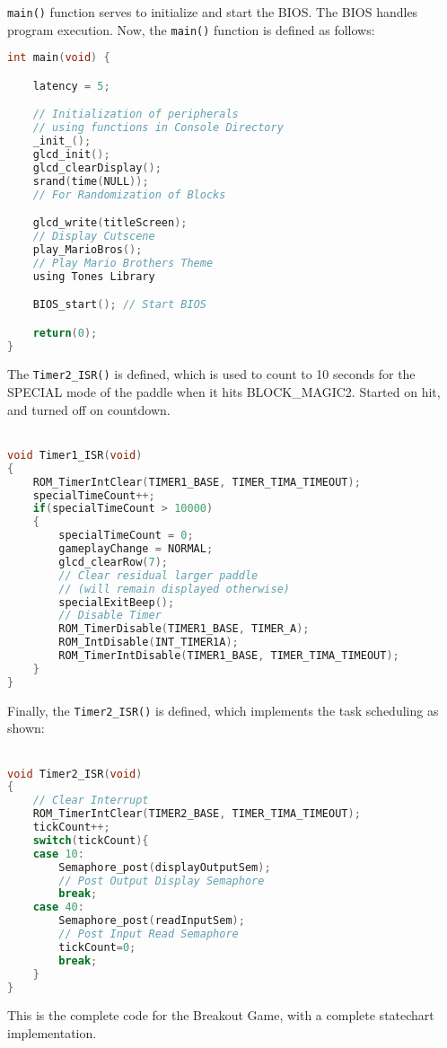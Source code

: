 \documentclass{article}
\begin{document}
\qquad \texttt{main()} function serves to initialize and start the BIOS. The BIOS handles program execution. Now, the \texttt{main()} function is defined as follows:
      \begin{lstlisting}[basicstyle = \small, language = C]
int main(void) {

    latency = 5;

    // Initialization of peripherals 
    // using functions in Console Directory
    _init_();
    glcd_init();
    glcd_clearDisplay();
    srand(time(NULL)); 
    // For Randomization of Blocks

    glcd_write(titleScreen); 
    // Display Cutscene
    play_MarioBros(); 
    // Play Mario Brothers Theme
    using Tones Library

    BIOS_start(); // Start BIOS

    return(0);
}
  \end{lstlisting}
\qquad The \texttt{Timer2\_ISR()} is defined, which is used to count to 10 seconds for the SPECIAL mode of the paddle when it hits BLOCK\_MAGIC2. Started on hit, and turned off on countdown.\\ \\
      \begin{lstlisting}[basicstyle = \small, language = C]
void Timer1_ISR(void)
{
    ROM_TimerIntClear(TIMER1_BASE, TIMER_TIMA_TIMEOUT);
    specialTimeCount++;
    if(specialTimeCount > 10000)
    {
        specialTimeCount = 0;
        gameplayChange = NORMAL;
        glcd_clearRow(7); 
        // Clear residual larger paddle 
        // (will remain displayed otherwise)
        specialExitBeep();
        // Disable Timer
        ROM_TimerDisable(TIMER1_BASE, TIMER_A);
        ROM_IntDisable(INT_TIMER1A);
        ROM_TimerIntDisable(TIMER1_BASE, TIMER_TIMA_TIMEOUT);
    }
}
  \end{lstlisting}
\qquad Finally, the \texttt{Timer2\_ISR()} is defined, which implements the task scheduling as shown: \\ \\
      \begin{lstlisting}[basicstyle = \small, language = C]
void Timer2_ISR(void)
{
    // Clear Interrupt
    ROM_TimerIntClear(TIMER2_BASE, TIMER_TIMA_TIMEOUT);
    tickCount++;
    switch(tickCount){
    case 10:
        Semaphore_post(displayOutputSem); 
        // Post Output Display Semaphore
        break;
    case 40:
        Semaphore_post(readInputSem); 
        // Post Input Read Semaphore
        tickCount=0;
        break;
    }
}
  \end{lstlisting}
This is the complete code for the Breakout Game, with a complete statechart implementation.
\end{document}
